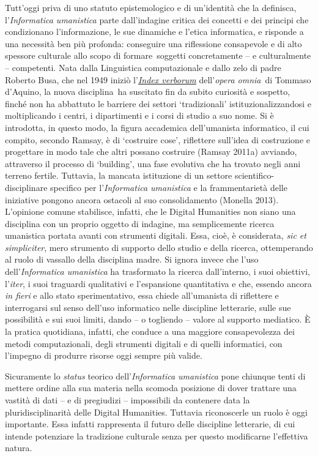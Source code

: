 {{Tutt'oggi priva di uno statuto epistemologico e di un'identità che la
definisca, l'\emph{Informatica umanistica} parte dall'indagine critica
dei concetti e dei principi che condizionano l'informazione, le sue
dinamiche e l'etica informatica, e risponde a una necessità ben più
profonda: conseguire una riflessione consapevole e di alto spessore
culturale allo scopo di formare~soggetti concretamente -- e
culturalmente -- competenti. Nata dalla Linguistica computazionale e
dallo zelo di padre Roberto Busa, che nel 1949 iniziò
l'\href{http://www.corpusthomisticum.org/it/index.age}{\emph{Index
verborum}} dell'\emph{opera omnia}~di Tommaso d'Aquino, la nuova
disciplina~ha suscitato fin da subito curiosità e sospetto, finché non
ha abbattuto le barriere dei settori `tradizionali'
istituzionalizzandosi e moltiplicando i centri, i dipartimenti e i corsi
di studio a suo nome. Si è introdotta, in questo modo, la figura
accademica dell'umanista informatico, il cui compito, secondo Ramsay, è
di `costruire cose', riflettere sull'idea di costruzione e progettare in
modo tale che altri possano costruire (Ramsay 2011a) avviando,
attraverso il processo di `building', una fase evolutiva che ha trovato
negli anni terreno fertile. Tuttavia, la mancata istituzione di un
settore scientifico-disciplinare specifico per l'\emph{Informatica
umanistica} e la frammentarietà delle iniziative pongono ancora ostacoli
al suo consolidamento (Monella 2013). L'opinione comune stabilisce,
infatti, che le Digital Humanities non siano una disciplina con un
proprio oggetto di indagine, ma semplicemente ricerca umanistica portata
avanti con strumenti digitali. Essa, cioè, è considerata, \emph{sic et
simpliciter}, mero strumento di supporto dello studio e della ricerca,
ottemperando al ruolo di vassallo della disciplina madre. Si ignora
invece che l'uso dell'\emph{Informatica umanistica} ha trasformato la
ricerca dall'interno, i suoi obiettivi, l'\emph{iter}, i suoi traguardi
qualitativi e l'espansione quantitativa e che, essendo ancora \emph{in
fieri} e allo stato sperimentativo, essa chiede all'umanista di
riflettere e interrogarsi sul senso dell'uso informatico nelle
discipline letterarie, sulle sue possibilità e sui suoi limiti, dando --
o togliendo -- valore al supporto mediatico. È la pratica quotidiana,
infatti, che conduce a una maggiore consapevolezza dei metodi
computazionali, degli strumenti digitali e di quelli informatici, con
l'impegno di produrre risorse oggi sempre più valide.

Sicuramente lo \emph{status} teorico dell'\emph{Informatica umanistica}
pone chiunque tenti di mettere ordine alla sua materia nella scomoda
posizione di dover trattare una vastità di dati -- e di pregiudizi --
impossibili da contenere data la pluridisciplinarità delle Digital
Humanities. Tuttavia riconoscerle un ruolo è oggi importante. Essa
infatti rappresenta il futuro delle discipline letterarie, di cui
intende potenziare la tradizione culturale senza per questo modificarne
l'effettiva natura.

}}
